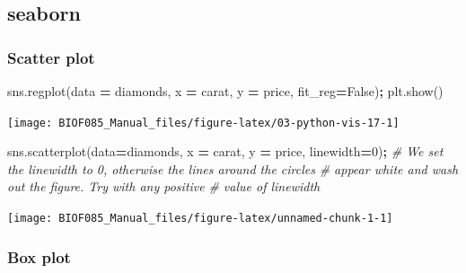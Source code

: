 \documentclass[
  letterpaper,
]{scrbook}
\newenvironment{Shaded}{\begin{snugshade}}{\end{snugshade}}
\newcommand{\CommentTok}[1]{\textcolor[rgb]{0.56,0.35,0.01}{\textit{#1}}}
\newcommand{\DecValTok}[1]{\textcolor[rgb]{0.00,0.00,0.81}{#1}}
\newcommand{\NormalTok}[1]{#1}
\newcommand{\OperatorTok}[1]{\textcolor[rgb]{0.81,0.36,0.00}{\textbf{#1}}}
\newcommand{\StringTok}[1]{\textcolor[rgb]{0.31,0.60,0.02}{#1}}
\newcommand{\VariableTok}[1]{\textcolor[rgb]{0.00,0.00,0.00}{#1}}
\begin{document}
\hypertarget{seaborn-1}{%
\subsection{seaborn}\label{seaborn-1}}

\hypertarget{scatter-plot-1}{%
\subsubsection{Scatter plot}\label{scatter-plot-1}}

\begin{Shaded}
\begin{Highlighting}[]
\NormalTok{sns.regplot(data }\OperatorTok{=}\NormalTok{ diamonds, x }\OperatorTok{=} \StringTok{\textquotesingle{}carat\textquotesingle{}}\NormalTok{, y }\OperatorTok{=} \StringTok{\textquotesingle{}price\textquotesingle{}}\NormalTok{, fit\_reg}\OperatorTok{=}\VariableTok{False}\NormalTok{)}\OperatorTok{;}
\NormalTok{plt.show()}
\end{Highlighting}
\end{Shaded}

\begin{center}\texttt{[image: BIOF085\_Manual\_files/figure-latex/03-python-vis-17-1]} \end{center}

\begin{Shaded}
\begin{Highlighting}[]
\NormalTok{sns.scatterplot(data}\OperatorTok{=}\NormalTok{diamonds, x }\OperatorTok{=} \StringTok{\textquotesingle{}carat\textquotesingle{}}\NormalTok{, y }\OperatorTok{=} \StringTok{\textquotesingle{}price\textquotesingle{}}\NormalTok{, linewidth}\OperatorTok{=}\DecValTok{0}\NormalTok{)}\OperatorTok{;} 
\CommentTok{\# We set the linewidth to 0, otherwise the lines around the circles}
\CommentTok{\# appear white and wash out the figure. Try with any positive }
\CommentTok{\# value of linewidth}
\end{Highlighting}
\end{Shaded}

\begin{center}\texttt{[image: BIOF085\_Manual\_files/figure-latex/unnamed-chunk-1-1]} \end{center}

\hypertarget{box-plot-1}{%
\subsubsection{Box plot}\label{box-plot-1}}
\end{document}
